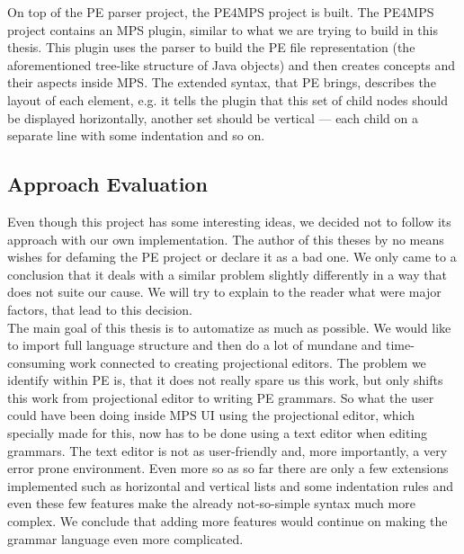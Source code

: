 On top of the PE parser project, the PE4MPS project is built.
The PE4MPS project contains an MPS plugin, similar to what we are trying to build in this thesis.
This plugin uses the parser to build the PE file representation (the aforementioned tree-like structure of Java objects) and then creates concepts and their aspects inside MPS.
The extended syntax, that PE brings, describes the layout of each element, e.g. it tells the plugin that this set of child nodes should be displayed horizontally, another set should be vertical --- each child on a separate line with some indentation and so on.

\subsection{Approach Evaluation}
Even though this project has some interesting ideas, we decided not to follow its approach with our own implementation.
The author of this theses by no means wishes for defaming the PE project or declare it as a bad one.
We only came to a conclusion that it deals with a similar problem slightly differently in a way that does not suite our cause.
We will try to explain to the reader what were major factors, that lead to this decision.
\\

The main goal of this thesis is to automatize as much as possible.
We would like to import full language structure and then do a lot of mundane and time-consuming work connected to creating projectional editors.
The problem we identify within PE is, that it does not really spare us this work, but only shifts this work from projectional editor to writing PE grammars.
So what the user could have been doing inside MPS UI using the projectional editor, which specially made for this, now has to be done using a text editor when editing grammars.
The text editor is not as user-friendly and, more importantly, a very error prone environment.
Even more so as so far there are only a few extensions implemented such as horizontal and vertical lists and some indentation rules and even these few features make the already not-so-simple syntax much more complex.
We conclude that adding more features would continue on making the grammar language even more complicated.
\\

